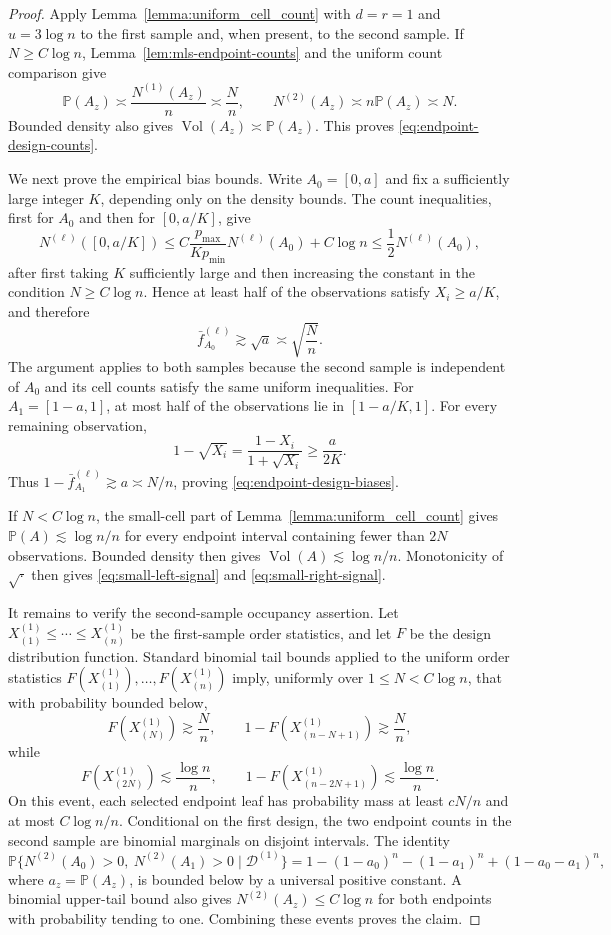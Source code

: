 \documentclass[11pt]{article}
\theoremstyle{plain}
\theoremstyle{definition}
\theoremstyle{remark}
\theoremstyle{plain}
\renewcommand{\P}{\mathbb{P}}
\DeclareMathOperator{\Vol}{Vol}
\newcommand{\1}{\mathbbm{1}}
\begin{document}
\begin{proof}
Apply Lemma~\ref{lemma:uniform_cell_count} with $d=r=1$ and
$u=3\log n$ to the first sample and, when present, to the second sample.
If $N\ge C\log n$, Lemma~\ref{lem:mls-endpoint-counts} and the uniform
count comparison give
\[
 \P(A_z)\asymp \frac{N^{(1)}(A_z)}{n}\asymp\frac{N}{n},
 \qquad
 N^{(2)}(A_z)\asymp n\P(A_z)\asymp N.
\]
Bounded density also gives $\Vol(A_z)\asymp\P(A_z)$.
This proves \eqref{eq:endpoint-design-counts}.

We next prove the empirical bias bounds. Write $A_0=[0,a]$ and fix a
sufficiently large integer $K$, depending only on the density bounds. The
count inequalities, first for $A_0$ and then for $[0,a/K]$, give
\[
 N^{(\ell)}([0,a/K])
 \le C\frac{p_{\max}}{Kp_{\min}}N^{(\ell)}(A_0)+C\log n
 \le \frac12 N^{(\ell)}(A_0),
\]
after first taking $K$ sufficiently large and then increasing the constant
in the condition $N\ge C\log n$. Hence at least half of the observations satisfy
$X_i\ge a/K$, and therefore
\[
 \bar f_{A_0}^{(\ell)}\gtrsim\sqrt a
 \asymp\sqrt{\frac{N}{n}}.
\]
The argument applies to both samples because the second sample is independent
of $A_0$ and its cell counts satisfy the same uniform inequalities. For
$A_1=[1-a,1]$, at most half of the observations lie in
$[1-a/K,1]$. For every remaining observation,
\[
 1-\sqrt{X_i}=\frac{1-X_i}{1+\sqrt{X_i}}\ge\frac{a}{2K}.
\]
Thus $1-\bar f_{A_1}^{(\ell)}\gtrsim a\asymp N/n$, proving
\eqref{eq:endpoint-design-biases}.

If $N<C\log n$, the small-cell part of
Lemma~\ref{lemma:uniform_cell_count} gives $\P(A)\lesssim\log n/n$
for every endpoint interval containing fewer than $2N$ observations.
Bounded density then gives $\Vol(A)\lesssim\log n/n$.
Monotonicity of $\sqrt{\cdot}$ then gives
\eqref{eq:small-left-signal} and \eqref{eq:small-right-signal}.

It remains to verify the second-sample occupancy assertion. Let
$X_{(1)}^{(1)}\le\cdots\le X_{(n)}^{(1)}$ be the first-sample order
statistics, and let $F$ be the design distribution function. Standard
binomial tail bounds applied to the uniform order statistics
$F(X_{(1)}^{(1)}),\ldots,F(X_{(n)}^{(1)})$ imply, uniformly over
$1\le N<C\log n$, that with probability bounded below,
\[
 F(X_{(N)}^{(1)})\gtrsim \frac{N}{n},
 \qquad
 1-F(X_{(n-N+1)}^{(1)})\gtrsim\frac{N}{n},
\]
while
\[
 F(X_{(2N)}^{(1)})\lesssim\frac{\log n}{n},
 \qquad
 1-F(X_{(n-2N+1)}^{(1)})\lesssim\frac{\log n}{n}.
\]
On this event, each selected endpoint leaf has probability mass at least
$cN/n$ and at most $C\log n/n$. Conditional on the first design, the two endpoint
counts in the second sample are binomial marginals on disjoint intervals.
The identity
\[
 \P\{N^{(2)}(A_0)>0,\ N^{(2)}(A_1)>0\mid\mathcal D^{(1)}\}
 =
 1-(1-a_0)^n-(1-a_1)^n+(1-a_0-a_1)^n,
\]
where $a_z=\P(A_z)$, is bounded below by a universal positive constant.
A binomial upper-tail bound also gives
$N^{(2)}(A_z)\le C\log n$ for both endpoints with probability tending to
one. Combining these events proves the claim.
\end{proof}
\end{document}
